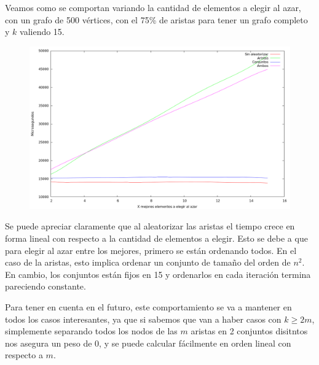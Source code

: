 Veamos como se comportan variando la cantidad de elementos a elegir al azar,
con un grafo de 500 vértices, con el 75\% de aristas para tener un grafo
completo y $k$ valiendo 15.
\vspace*{0.5cm}

\begin{figure}[H]
  \begin{center}
    \includegraphics[scale=0.35]{imagenes/grasp-goloso-x-tiempo.png}
  \end{center}
\end{figure}

\vspace*{0.5cm}

Se puede apreciar claramente que al aleatorizar las aristas el tiempo crece
en forma lineal con respecto a la cantidad de elementos a elegir. Esto se debe
a que para elegir al azar entre los mejores, primero se están ordenando todos.
En el caso de la aristas, esto implica ordenar un conjunto de tamaño del orden
de $n^2$. En cambio, los conjuntos están fijos en 15 y ordenarlos en cada
iteración termina pareciendo constante.

Para tener en cuenta en el futuro, este comportamiento se va a mantener en
todos los casos interesantes, ya que si sabemos que van a haber casos con
$k \geq 2m$, simplemente separando todos los nodos de las $m$ aristas en 2
conjuntos disitntos nos asegura un peso de 0, y se puede calcular fácilmente
en orden lineal con respecto a $m$.

\vspace*{0.5cm}

